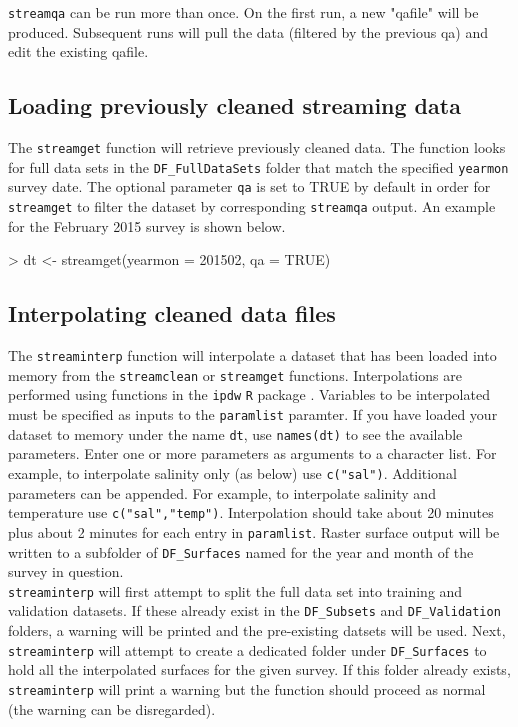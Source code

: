 \documentclass[12pt]{article}
\begin{document}
\texttt{streamqa} can be run more than once. On the first run, a new "qafile" will be produced. Subsequent runs will pull the data (filtered by the previous qa) and edit the existing qafile.

\subsection{Loading previously cleaned streaming data}

The \texttt{streamget} function will retrieve previously cleaned data. The function looks for full data sets in the \verb|DF_FullDataSets| folder that match the specified \texttt{yearmon} survey date. The optional parameter \texttt{qa} is set to TRUE by default in order for \texttt{streamget} to filter the dataset by corresponding \texttt{streamqa} output. An example for the February 2015 survey is shown below.

\begin{Schunk}
\begin{Sinput}
> dt <- streamget(yearmon = 201502, qa = TRUE)
\end{Sinput}
\end{Schunk}

\subsection{Interpolating cleaned data files}

The \texttt{streaminterp} function will interpolate a dataset that has been loaded into memory from the \texttt{streamclean} or \texttt{streamget} functions. Interpolations are performed using functions in the \texttt{ipdw} \texttt{R} package \citep{ipdw}. Variables to be interpolated must be specified as inputs to the \texttt{paramlist} paramter. If you have loaded your dataset to memory under the name \texttt{dt}, use \texttt{names(dt)} to see the available parameters. Enter one or more parameters as arguments to a character list. For example, to interpolate salinity only (as below) use \texttt{c("sal")}. Additional parameters can be appended. For example, to interpolate salinity and temperature use \texttt{c("sal","temp")}. Interpolation should take about 20 minutes plus about 2 minutes for each entry in \texttt{paramlist}. Raster surface output will be written to a subfolder of \verb|DF_Surfaces| named for the year and month of the survey in question.\\

\texttt{streaminterp} will first attempt to split the full data set into training and validation datasets. If these already exist in the \verb|DF_Subsets| and \verb|DF_Validation| folders, a warning will be printed and the pre-existing datsets will be used. Next, \texttt{streaminterp} will attempt to create a dedicated folder under \verb|DF_Surfaces| to hold all the interpolated surfaces for the given survey. If this folder already exists, \texttt{streaminterp} will print a warning but the function should proceed as normal (the warning can be disregarded).\\
\end{document}
